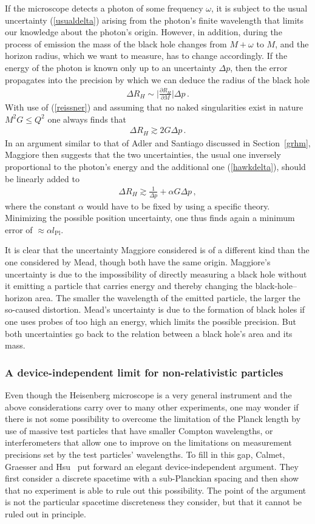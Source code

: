 \documentclass{article}
\def\beqn{\begin{eqnarray}}
\def\eeqn{\end{eqnarray}}
\begin{document}
If the microscope detects a photon of some frequency $\omega$, it is subject to the
usual uncertainty (\ref{usualdelta}) arising from the photon's finite wavelength that
limits our knowledge about the photon's origin. However, in
addition, during the
process of emission the mass of the black hole changes from $M+\omega$ to $M$, and
the horizon radius, which we want to measure, has to change accordingly. If the
energy of the photon is known only up to an uncertainty $\Delta p$, then the error
propagates into the precision by which we can deduce the radius of the black hole
\beqn
\Delta R_H \sim \Big| \frac{\partial R_H}{\partial M}\Big| \Delta p \,.
\eeqn
With use of (\ref{reissner}) and assuming that no naked singularities exist in nature $M^2 G \leq Q^2$ 
one always finds that
\beqn
\Delta R_H \gtrsim 2 G \Delta p \,.
\label{hawkdelta}
\eeqn
In an argument similar to that of Adler and Santiago discussed in Section~\ref{grhm}, Maggiore 
then suggests that the two uncertainties, the usual one inversely proportional to
the photon's energy and the additional one (\ref{hawkdelta}), should be linearly added to
\beqn
\Delta R_H \gtrsim \frac{1}{\Delta p} + \alpha G \Delta p \,,
\eeqn
where the constant $\alpha$ would have to be fixed by using a specific theory. Minimizing
the possible position uncertainty, one thus finds again a minimum error of 
$\approx \alpha l_{\mathrm{Pl}}$. 

It is clear that the uncertainty
Maggiore considered is of a different kind than the one considered by Mead, though both
have the same origin. Maggiore's uncertainty is due
to the impossibility of directly measuring a black hole without it emitting a particle
that carries energy and thereby changing the black-hole--horizon area. The smaller the wavelength
of the emitted particle, the larger the so-caused distortion. Mead's uncertainty is due to the formation
of black holes if one uses probes of too high an energy, which limits the possible precision. But both
uncertainties go back to the relation between a black hole's area and its mass.


\subsubsection{A device-independent limit for non-relativistic particles}
\label{xavier}

Even though the Heisenberg microscope is a very general instrument and the above considerations
carry over to many other experiments, one may wonder if there is not some possibility to
overcome the limitation of the Planck length by use of massive test particles
that have smaller Compton wavelengths, or interferometers that allow one to improve
on the limitations on measurement precisions set by the test
particles' wavelengths. To fill in this gap, Calmet, Graesser and
Hsu~\cite{Calmet:2004mp,Calmet:2005mh} put forward an elegant
device-independent argument. They first consider a discrete spacetime
with a sub-Planckian spacing and then show that no experiment is able
to rule out this possibility. The point of the argument is not the
particular spacetime discreteness they consider, but that it cannot be
ruled out in principle. 
\end{document}
